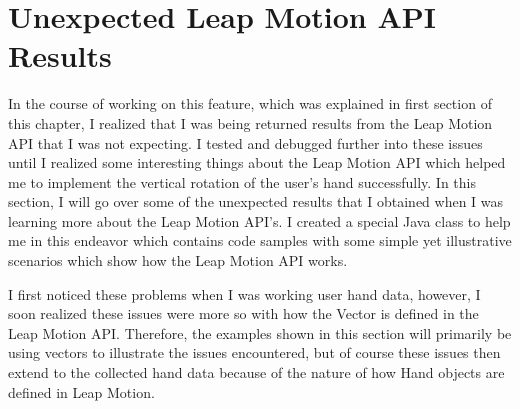 \section{Unexpected Leap Motion API Results} 
In the course of working on this feature, which was explained in first section of this chapter, I realized that I was being returned results from the Leap Motion API that I was not expecting. I tested and debugged further into these issues until I realized some interesting things about the Leap Motion API which helped me to implement the vertical rotation of the user's hand successfully. In this section, I will go over some of the unexpected results that I obtained when I was learning more about the Leap Motion API's. I created a special Java class to help me in this endeavor which contains code samples with some simple yet illustrative scenarios which show how the Leap Motion API works.

I first noticed these problems when I was working user hand data, however, I soon realized these issues were more so with how the Vector is defined in the Leap Motion API. Therefore, the examples shown in this section will primarily be using vectors to illustrate the issues encountered, but of course these issues then extend to the collected hand data because of the nature of how Hand objects are defined in Leap Motion.


